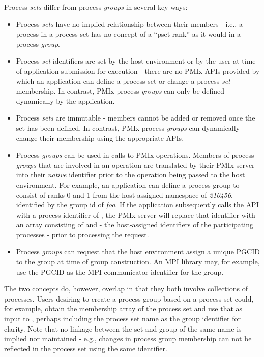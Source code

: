 Process \emph{sets} differ from process \emph{groups} in several key ways:

\begin{itemize}
    \item Process \emph{sets} have no implied relationship between their members - i.e., a process in a process set has no concept of a ``pset rank'' as it would in a process \emph{group}.
    \item Process \emph{set} identifiers are set by the host environment or by the user at time of application submission for execution -
    there are no \ac{PMIx} \acp{API} provided by which an application can define a process set or
    change a process \emph{set} membership. In contrast, \ac{PMIx} process
    \emph{groups} can only be defined dynamically by the application.
    \item Process \emph{sets} are immutable - members cannot be added or removed once the set has been defined. In contrast, \ac{PMIx} process \emph{groups} can dynamically change their membership using the appropriate \acp{API}.
    \item Process \emph{groups} can be used in calls to \ac{PMIx} operations. Members of process \emph{groups} that are involved in an operation are translated by their \ac{PMIx} server into their \emph{native} identifier prior to the operation being passed to the host environment. For example, an application can define a process group to consist of ranks 0 and 1 from the host-assigned namespace of \emph{210456}, identified by the group id of \emph{foo}. If the application subsequently calls the  \ac{API} with a process identifier of , the \ac{PMIx} server will replace that identifier with an array consisting of  and  - the host-assigned identifiers of the participating processes - prior to processing the request.
    \item Process \emph{groups} can request that the host environment assign a unique  \ac{PGCID} to the group at time of group construction. An \ac{MPI} library may, for example, use the \ac{PGCID} as the \ac{MPI} communicator identifier for the group.
\end{itemize}

The two concepts do, however, overlap in that they both
involve collections of processes. Users desiring to create a process group
based on a process set could, for example, obtain the membership array of the
process set and use that as input to , perhaps
including the process set name as the group identifier for clarity. Note that
no linkage between the set and group of the same name is implied nor
maintained - e.g., changes in process group membership can not be
reflected in the process set using the same identifier.

